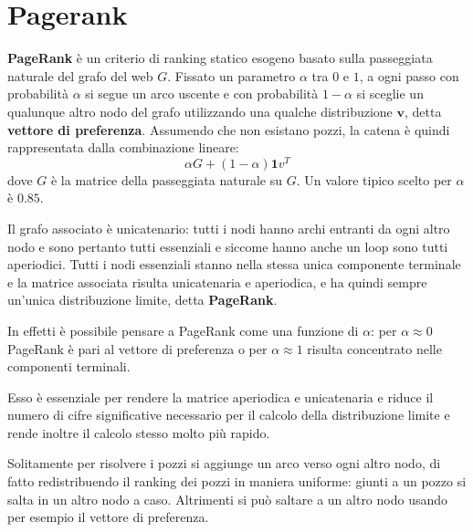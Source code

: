 \documentclass[\main/main.tex]{subfiles}
\begin{document}
\section{Pagerank}
\begin{multicols}{2}
\begin{definition}[PageRank]
    \textbf{PageRank} è un criterio di ranking statico esogeno basato sulla passeggiata naturale del grafo del web \(G\). Fissato un parametro \(\alpha\) tra \(0\) e \(1\), a ogni passo con probabilità \(\alpha\) si segue un arco uscente e con probabilità \(1-\alpha\) si sceglie un qualunque altro nodo del grafo utilizzando una qualche distribuzione \(\bm{v}\), detta \textbf{vettore di preferenza}. Assumendo che non esistano pozzi, la catena è quindi rappresentata dalla combinazione lineare:
    \[
        \alpha G+(1-\alpha) \mathbf{1} v^{T}
    \]
    dove \(G\) è la matrice della passeggiata naturale su \(G\). Un valore tipico scelto per \(\alpha\) è \(0.85\).
    
    Il grafo associato è unicatenario: tutti i nodi hanno archi entranti da ogni altro nodo e sono pertanto tutti essenziali e siccome hanno anche un loop sono tutti aperiodici. Tutti i nodi essenziali stanno nella stessa unica componente terminale e la matrice associata risulta unicatenaria e aperiodica, e ha quindi sempre un'unica distribuzione limite, detta \textbf{PageRank}.
\end{definition}
\begin{definition}
    In effetti è possibile pensare a PageRank come una funzione di \(\alpha\): per \(\alpha\approx 0\) PageRank è pari al vettore di preferenza o per \(\alpha\approx 1\) risulta concentrato nelle componenti terminali.
    
    Esso è essenziale per rendere la matrice aperiodica e unicatenaria e riduce il numero di cifre significative necessario per il calcolo della distribuzione limite e rende inoltre il calcolo stesso molto più rapido.
\end{definition}
\begin{observation}
    Solitamente per risolvere i pozzi si aggiunge un arco verso ogni altro nodo, di fatto redistribuendo il ranking dei pozzi in maniera uniforme: giunti a un pozzo si salta in un altro nodo a caso. Altrimenti si può saltare a un altro nodo usando per esempio il vettore di preferenza.
\end{observation}
\end{multicols}
\end{document}
